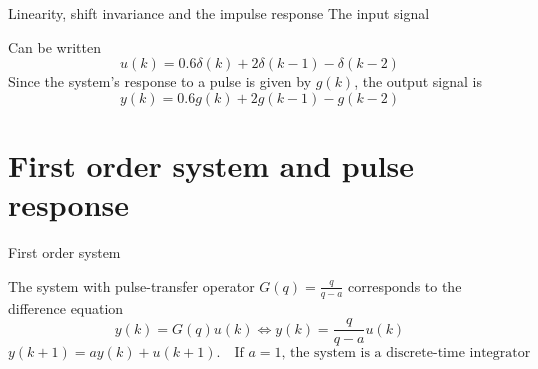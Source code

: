 \documentclass[presentation,aspectratio=1610]{beamer}
\begin{document}
\begin{frame}[label={sec:orgb36aade}]{Linearity, shift invariance and the impulse response}
The input signal
\begin{center}
\end{center}


Can be written 
\[u(k) = 0.6\delta(k) + 2\delta(k-1) - \delta(k-2) \]
Since the system's response to a pulse is given by \(g(k)\), the output signal is
\[ y(k) = 0.6g(k) + 2g(k-1) - g(k-2) \]
\end{frame}



\section{First order system and pulse response}
\label{sec:orgbd0f28a}

\begin{frame}[label={sec:org757d292}]{First order system}
\begin{center}
\end{center}

The system with pulse-transfer operator \(G(q)=\frac{q}{q-a}\) corresponds to the difference equation
\[ y(k) = G(q)u(k) \Leftrightarrow y(k) = \frac{q}{q-a} u(k) \]
\[ y(k+1) = ay(k) + u(k+1). \quad \text{If $a=1$, the system is a discrete-time integrator}\]
\end{frame}
\end{document}

